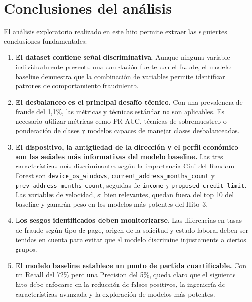 \documentclass[12pt,a4paper]{report}
\begin{document}
\section{Conclusiones del análisis}
\label{sec:h2_conclusiones}

El análisis exploratorio realizado en este hito permite extraer las siguientes conclusiones fundamentales:

\begin{enumerate}
    \item \textbf{El dataset contiene señal discriminativa.} Aunque ninguna variable individualmente presenta una correlación fuerte con el fraude, el modelo baseline demuestra que la combinación de variables permite identificar patrones de comportamiento fraudulento.

    \item \textbf{El desbalanceo es el principal desafío técnico.} Con una prevalencia de fraude del 1,1\%, las métricas y técnicas estándar no son aplicables. Es necesario utilizar métricas como PR-AUC, técnicas de sobremuestreo o ponderación de clases y modelos capaces de manejar clases desbalanceadas.

    \item \textbf{El dispositivo, la antigüedad de la dirección y el perfil económico son las señales más informativas del modelo baseline.} Las tres características más discriminantes según la importancia Gini del Random Forest son \texttt{device\_os\_windows}, \texttt{current\_address\_months\_count} y \texttt{prev\_address\_months\_count}, seguidas de \texttt{income} y \texttt{proposed\_credit\_limit}. Las variables de velocidad, si bien relevantes, quedan fuera del top 10 del baseline y ganarán peso en los modelos más potentes del Hito~3.

    \item \textbf{Los sesgos identificados deben monitorizarse.} Las diferencias en tasas de fraude según tipo de pago, origen de la solicitud y estado laboral deben ser tenidas en cuenta para evitar que el modelo discrimine injustamente a ciertos grupos.

    \item \textbf{El modelo baseline establece un punto de partida cuantificable.} Con un Recall del 72\% pero una Precision del 5\%, queda claro que el siguiente hito debe enfocarse en la reducción de falsos positivos, la ingeniería de características avanzada y la exploración de modelos más potentes.
\end{enumerate}
\end{document}
